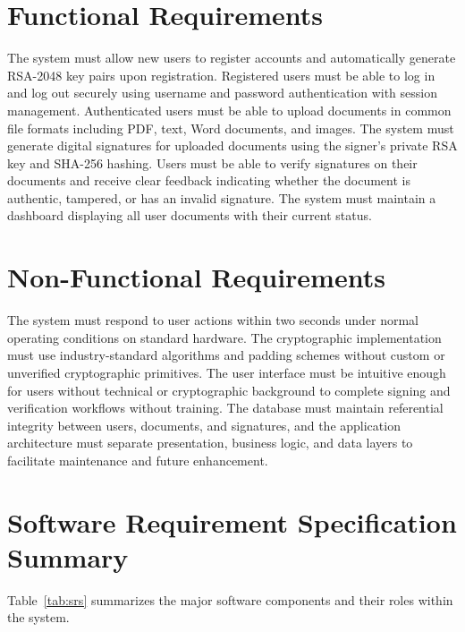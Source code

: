 \section{Functional Requirements}

The system must allow new users to register accounts and automatically generate RSA-2048 key pairs upon registration. Registered users must be able to log in and log out securely using username and password authentication with session management. Authenticated users must be able to upload documents in common file formats including PDF, text, Word documents, and images. The system must generate digital signatures for uploaded documents using the signer's private RSA key and SHA-256 hashing. Users must be able to verify signatures on their documents and receive clear feedback indicating whether the document is authentic, tampered, or has an invalid signature. The system must maintain a dashboard displaying all user documents with their current status.

\section{Non-Functional Requirements}

The system must respond to user actions within two seconds under normal operating conditions on standard hardware. The cryptographic implementation must use industry-standard algorithms and padding schemes without custom or unverified cryptographic primitives. The user interface must be intuitive enough for users without technical or cryptographic background to complete signing and verification workflows without training. The database must maintain referential integrity between users, documents, and signatures, and the application architecture must separate presentation, business logic, and data layers to facilitate maintenance and future enhancement.

\section{Software Requirement Specification Summary}

Table~\ref{tab:srs} summarizes the major software components and their roles within the system.

